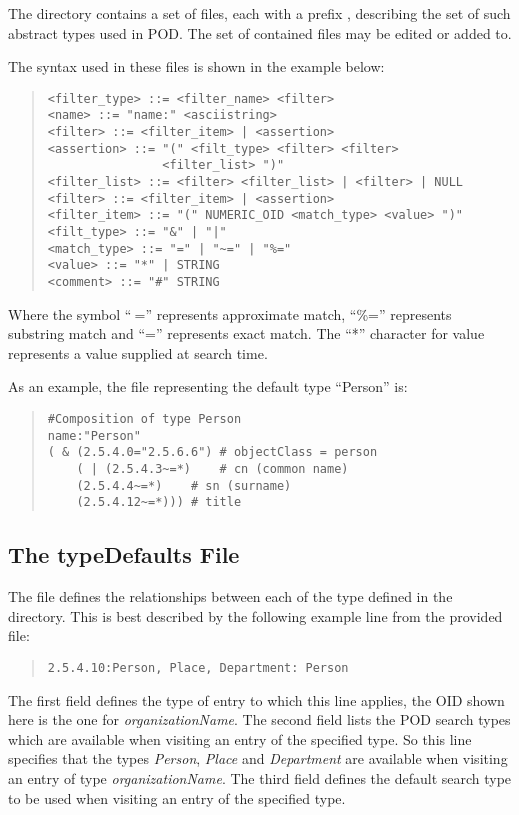 The directory  contains a set of files,
each with a prefix ,
describing the set of such abstract types used in POD.
The set of contained files may be edited or added to.

The syntax used in these files is shown in the example below:

\begin{quote}\small\begin{verbatim}
<filter_type> ::= <filter_name> <filter>
<name> ::= "name:" <asciistring>
<filter> ::= <filter_item> | <assertion>
<assertion> ::= "(" <filt_type> <filter> <filter>
                <filter_list> ")"
<filter_list> ::= <filter> <filter_list> | <filter> | NULL
<filter> ::= <filter_item> | <assertion>
<filter_item> ::= "(" NUMERIC_OID <match_type> <value> ")"
<filt_type> ::= "&" | "|"
<match_type> ::= "=" | "~=" | "%="
<value> ::= "*" | STRING
<comment> ::= "#" STRING
\end{verbatim}\end{quote}

Where the symbol ``$~$='' represents approximate match,
``\%='' represents substring match and ``='' represents exact match.
The ``*'' character for value represents a value supplied at search time.

As an example,
the file representing the default type ``Person'' is:

\begin{quote}\begin{verbatim}
#Composition of type Person
name:"Person"
( & (2.5.4.0="2.5.6.6") # objectClass = person
    ( | (2.5.4.3~=*)	# cn (common name)
	(2.5.4.4~=*)	# sn (surname)
	(2.5.4.12~=*)))	# title
\end{verbatim}\end{quote}

\subsection {The typeDefaults File}

The  file defines the relationships between each of the
type defined in the  directory.
This is best described by the following example line from the provided
 file:
\begin{quote}\begin{verbatim}
2.5.4.10:Person, Place, Department: Person
\end{verbatim}\end{quote}
The first field defines the type of entry to which this line applies,
the OID shown here is the one for {\em organizationName}.
The second field lists the POD search types which are available when visiting 
an entry of the specified type. 
So this line specifies that the types {\em Person},
{\em Place} and {\em Department} are available when visiting an entry of
type {\em organizationName}.
The third field defines the default search type to be used when visiting
an entry of the specified type.
